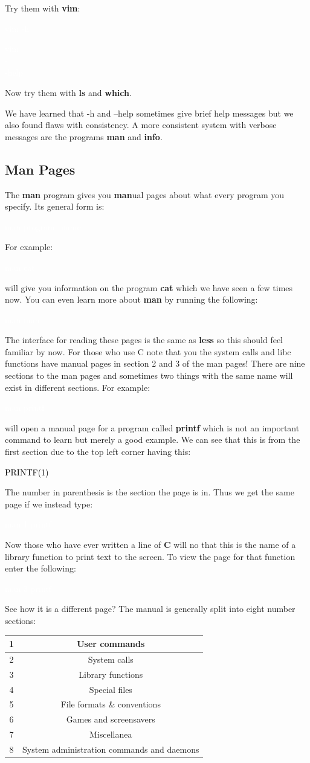 \documentclass[oneside]{book}
\newcommand{\commandline}[1]{\begin{center} \colorbox{Dark}{\textcolor{white}{#1}} \end{center}}
\newcommand{\exampleout}[1]{\begin{center} \colorbox{Light}{\textcolor{black}{#1}} \end{center}}
\begin{document}
Try them with \textbf{vim}:
	\commandline{vim -h}
	\commandline{vim \ \\-\\-help}
	Now try them with \textbf{ls} and \textbf{which}.

We have learned that -h and --help sometimes give brief help messages but we also found flaws with consistency. A more consistent system with verbose messages are the programs \textbf{man} and \textbf{info}.
\subsection{Man Pages}
The \textbf{man} program gives you \textbf{man}ual pages about what every program you specify. Its general form is:
\commandline{man program\_name}
For example:
\commandline{man cat}
will give you information on the program \textbf{cat} which we have seen a few times now. You can even learn more about \textbf{man} by running the following:
\commandline{man man}
The interface for reading these pages is the same as \textbf{less} so this should feel familiar by now. For those who use C note that you the system calls and libc functions have manual pages in section 2 and 3 of the man pages! 
There are nine sections to the man pages and sometimes two things with the same name will exist in different sections. For example:
\commandline{man printf}
will open a manual page for a program called \textbf{printf} which is not an important command to learn but merely a good example. We can see that this is from the first section due to the top left corner having this:
\exampleout{PRINTF(1)}
The number in parenthesis is the section the page is in. Thus we get the same page if we instead type:
\commandline{man 1 printf}
Now those who have ever written a line of \textbf{C} will no that this is the name of a library function to print text to the screen. To view the page for that function enter the following:
\commandline{man 3 printf}
See how it is a different page? The manual is generally split into eight number sections:

\begin{center}
    \begin{tabular}{|c|c|}
        \hline
	    1 & User commands \\
	    \hline
        2 & System calls \\
        \hline
        3 & Library functions \\
        \hline
        4 & Special files \\
        \hline
        5 & File formats \& conventions \\
        \hline
        6 & Games and screensavers \\
        \hline
        7 & Miscellanea \\
        \hline
        8 & System administration commands and daemons \\
        \hline
    \end{tabular}
\end{center}
\end{document}
